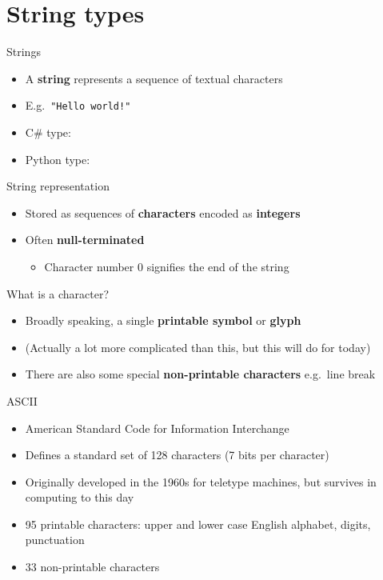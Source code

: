\part{String types}
\frame{\partpage}

\begin{frame}{Strings}
	\begin{itemize}
		\pause\item A \textbf{string} represents a sequence of textual characters
		\pause\item E.g.\ \lstinline{"Hello world!"}
		\pause\item C\# type: 
		\pause\item Python type: 
	\end{itemize}
\end{frame}

\begin{frame}{String representation}
	\begin{itemize}
		\pause\item Stored as sequences of \textbf{characters} encoded as \textbf{integers}
		\pause\item Often \textbf{null-terminated}
			\begin{itemize}
				\pause\item Character number 0 signifies the end of the string
			\end{itemize}
	\end{itemize}
\end{frame}

\begin{frame}{What is a character?}
	\begin{itemize}
		\pause\item Broadly speaking, a single \textbf{printable symbol} or \textbf{glyph}
		\pause\item (Actually a lot more complicated than this, but this will do for today)
		\pause\item There are also some special \textbf{non-printable characters} e.g.\ line break
	\end{itemize}
\end{frame}

\begin{frame}{ASCII}
	\begin{itemize}
		\pause\item American Standard Code for Information Interchange
		\pause\item Defines a standard set of 128 characters (7 bits per character)
		\pause\item Originally developed in the 1960s for teletype machines, but survives in computing to this day
		\pause\item 95 printable characters: upper and lower case English alphabet, digits, punctuation
		\pause\item 33 non-printable characters
	\end{itemize}
\end{frame}

